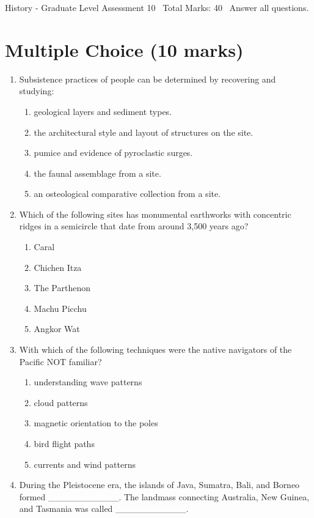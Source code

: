 \documentclass[12pt]{article}
\begin{document}
\begin{center}
History - Graduate Level Assessment 10 \
Total Marks: 40 \
Answer all questions.
\end{center}

\section*{Multiple Choice (10 marks)}
\begin{enumerate}[label=\arabic*.]
\item Subsistence practices of people can be determined by recovering and studying:
\begin{enumerate}[label=(\alph*)]
    \item geological layers and sediment types.
    \item the architectural style and layout of structures on the site.
    \item pumice and evidence of pyroclastic surges.
    \item the faunal assemblage from a site.
    \item an osteological comparative collection from a site.
\end{enumerate}
\item Which of the following sites has monumental earthworks with concentric ridges in a semicircle that date from around 3,500 years ago?
\begin{enumerate}[label=(\alph*)]
    \item Caral
    \item Chichen Itza
    \item The Parthenon
    \item Machu Picchu
    \item Angkor Wat
\end{enumerate}
\item With which of the following techniques were the native navigators of the Pacific NOT familiar?
\begin{enumerate}[label=(\alph*)]
    \item understanding wave patterns
    \item cloud patterns
    \item magnetic orientation to the poles
    \item bird flight paths
    \item currents and wind patterns
\end{enumerate}
\item During the Pleistocene era, the islands of Java, Sumatra, Bali, and Borneo formed \_\_\_\_\_\_\_\_\_\_\_. The landmass connecting Australia, New Guinea, and Tasmania was called \_\_\_\_\_\_\_\_\_\_\_.

\end{enumerate}
\end{document}
